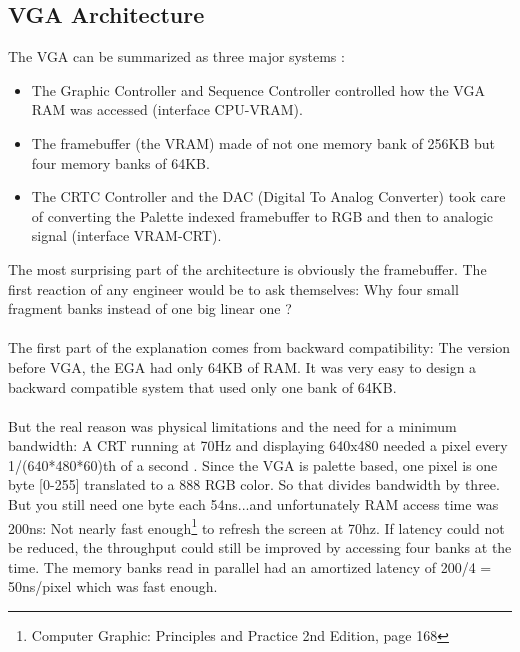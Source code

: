 \documentclass[book.tex]{subfiles}
\begin{document}
\subsection{VGA Architecture}

The VGA can be summarized as three major systems :

\begin{itemize}
\item The Graphic Controller and Sequence Controller controlled how the VGA RAM was accessed (interface CPU-VRAM).
\item The framebuffer (the VRAM) made of not one memory bank of 256KB but four memory banks of 64KB.
\item The CRTC Controller and the DAC (Digital To Analog Converter) took care of converting the Palette indexed framebuffer to RGB and then to analogic signal (interface VRAM-CRT).
\end{itemize}

The most surprising part of the architecture is obviously the framebuffer. The first reaction of any engineer would be to ask themselves: Why four small fragment banks instead of one big linear one ?\\
\\
The first part of the explanation comes from backward compatibility: The version before VGA, the EGA had only 64KB of RAM. It was very easy to design a backward compatible system that used only one bank of 64KB.\\
\\
But the real reason was physical limitations and the need for a minimum bandwidth: A CRT running at 70Hz and displaying 640x480 needed a pixel every 1/(640*480*60)th of a second . Since the VGA is palette based, one pixel is one byte [0-255] translated to a 888 RGB color. So that divides bandwidth by three. But you still need one byte each 54ns...and unfortunately RAM access time was 200ns: Not nearly fast enough\footnote{Computer Graphic: Principles and Practice 2nd Edition, page 168} to refresh the screen at 70hz. If latency could not be reduced, the throughput could still be improved by accessing four banks at the time. The memory banks read in parallel had an amortized latency of 200/4 = 50ns/pixel which was fast enough.
\end{document}
